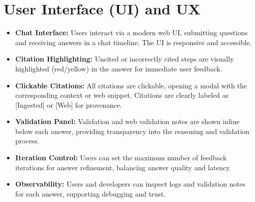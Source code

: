\documentclass{article}
\begin{document}
\section*{User Interface (UI) and UX}
\begin{itemize}[leftmargin=*, itemsep=0.5em]
  \item \textbf{Chat Interface:} Users interact via a modern web UI, submitting questions and receiving answers in a chat timeline. The UI is responsive and accessible.
  \item \textbf{Citation Highlighting:} Uncited or incorrectly cited steps are visually highlighted (red/yellow) in the answer for immediate user feedback.
  \item \textbf{Clickable Citations:} All citations are clickable, opening a modal with the corresponding context or web snippet. Citations are clearly labeled as [Ingested] or [Web] for provenance.
  \item \textbf{Validation Panel:} Validation and web validation notes are shown inline below each answer, providing transparency into the reasoning and validation process.
  \item \textbf{Iteration Control:} Users can set the maximum number of feedback iterations for answer refinement, balancing answer quality and latency.
  \item \textbf{Observability:} Users and developers can inspect logs and validation notes for each answer, supporting debugging and trust.
\end{itemize}
\end{document}
